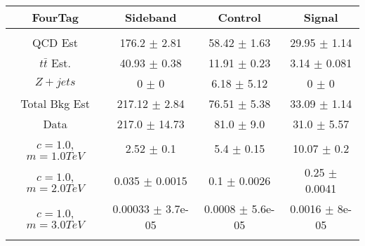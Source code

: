 \begin{footnotesize} 
\begin{tabular}{c|c|c|c} 
FourTag & Sideband & Control & Signal \\ 
\hline\hline 
& & & \\ 
QCD Est & 176.2 $\pm$ 2.81 & 58.42 $\pm$ 1.63 & 29.95 $\pm$ 1.14\\ 
$t\bar{t}$ Est.  & 40.93 $\pm$ 0.38 & 11.91 $\pm$ 0.23 & 3.14 $\pm$ 0.081\\ 
$Z+jets$ & 0 $\pm$ 0 & 6.18 $\pm$ 5.12 & 0 $\pm$ 0\\ 
Total Bkg Est & 217.12 $\pm$ 2.84 & 76.51 $\pm$ 5.38 & 33.09 $\pm$ 1.14\\ 
Data & 217.0 $\pm$ 14.73 & 81.0 $\pm$ 9.0 & 31.0 $\pm$ 5.57\\ 
$c=1.0$,$m=1.0TeV$ & 2.52 $\pm$ 0.1 & 5.4 $\pm$ 0.15 & 10.07 $\pm$ 0.2\\ 
$c=1.0$,$m=2.0TeV$ & 0.035 $\pm$ 0.0015 & 0.1 $\pm$ 0.0026 & 0.25 $\pm$ 0.0041\\ 
$c=1.0$,$m=3.0TeV$ & 0.00033 $\pm$ 3.7e-05 & 0.0008 $\pm$ 5.6e-05 & 0.0016 $\pm$ 8e-05\\ 
& & & \\ 
\hline\hline 
\end{tabular} 
\end{footnotesize} 
\newline 
